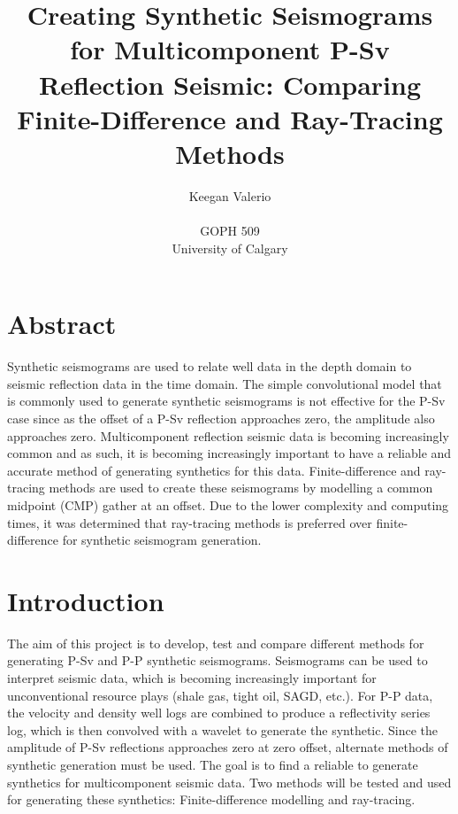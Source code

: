 \documentclass[12pt]{article}
\begin{document}
\title{Creating Synthetic Seismograms for Multicomponent P-Sv Reflection Seismic: Comparing Finite-Difference and Ray-Tracing Methods}
\author{Keegan Valerio \\ \\ GOPH 509\\University of Calgary}
\maketitle
{}
\clearpage

\tableofcontents
\pagebreak
{}

\listoffigures
\pagebreak

\section{Abstract}
	Synthetic seismograms are used to relate well data in the depth domain to seismic reflection data in the time domain. The simple convolutional model that is commonly used to generate synthetic seismograms is not effective for the P-Sv case since as the offset of a P-Sv reflection approaches zero, the amplitude also approaches zero. Multicomponent reflection seismic data is becoming increasingly common and as such, it is becoming increasingly important to have a reliable and accurate method of generating synthetics for this data.
	Finite-difference and ray-tracing methods are used to create these seismograms by modelling a common midpoint (CMP) gather at an offset. Due to the lower complexity and computing times, it was determined that ray-tracing methods is preferred over finite-difference for synthetic seismogram generation. 

\section{Introduction}

	The aim of this project is to develop, test and compare different methods for generating P-Sv and P-P synthetic seismograms. Seismograms can be used to interpret seismic data, which is becoming increasingly important for unconventional resource plays (shale gas, tight oil, SAGD, etc.). For P-P data, the velocity and density well logs are combined to produce a reflectivity series log, which is then convolved with a wavelet to generate the synthetic. Since the amplitude of P-Sv reflections approaches zero at zero offset, alternate methods of synthetic generation must be used. The goal is to find a reliable to generate synthetics for multicomponent seismic data. Two methods will be tested and used for generating these synthetics: Finite-difference modelling and ray-tracing.
	
\end{document}

